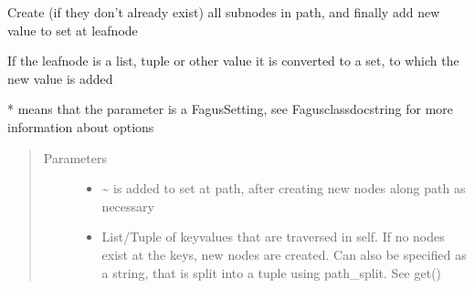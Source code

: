 \documentclass[a4paper,10pt,english]{sphinxmanual}
\begin{document}
\begin{fulllineitems}
\begin{fulllineitems}
\label{\detokenize{fagus.fagus:fagus.fagus.Fagus.add}}
\pysigstartsignatures
{}
\pysigstopsignatures
\sphinxAtStartPar
Create (if they don’t already exist) all sub\sphinxhyphen{}nodes in path, and finally add new value to set at leaf\sphinxhyphen{}node

\sphinxAtStartPar
If the leaf\sphinxhyphen{}node is a list, tuple or other value it is converted to a set, to which the new value is added

\sphinxAtStartPar
* means that the parameter is a Fagus\sphinxhyphen{}Setting, see Fagus\sphinxhyphen{}class\sphinxhyphen{}docstring for more information about options
\begin{quote}\begin{description}
\item[{Parameters}] \leavevmode\begin{itemize}
\item {}
\sphinxAtStartPar
{} \textendash{} \textasciitilde{} is added to set at path, after creating new nodes along path as necessary

\item {}
\sphinxAtStartPar
{} \textendash{} List/Tuple of key\sphinxhyphen{}values that are traversed in self. If no nodes exist at the keys, new nodes are
created. Can also be specified as a string, that is split into a tuple using path\_split. See get()


\end{itemize}
\end{description}
\end{quote}
\end{fulllineitems}
\end{fulllineitems}
\end{document}

